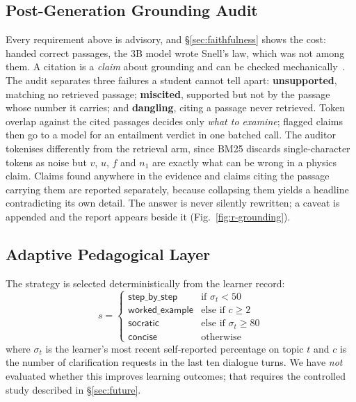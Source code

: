 \documentclass[conference]{IEEEtran}
\begin{document}
\subsection{Post-Generation Grounding Audit}
\label{sec:audit}
Every requirement above is advisory, and §\ref{sec:faithfulness} shows the
cost: handed correct passages, the $3$B model wrote Snell's law, which was not
among them. A citation is a \emph{claim} about grounding and can be checked
mechanically~\cite{manakul2023,gao2023}. The audit separates three failures a
student cannot tell apart: \textbf{unsupported}, matching no retrieved passage;
\textbf{miscited}, supported but not by the passage whose number it carries;
and \textbf{dangling}, citing a passage never retrieved. Token overlap against
the cited passages decides only \emph{what to examine}; flagged claims then go
to a model for an entailment verdict in one batched call. The auditor tokenises
differently from the retrieval arm, since BM25 discards single-character tokens
as noise but $v$, $u$, $f$ and $n_1$ are exactly what can be wrong in a physics
claim. Claims found anywhere in the evidence and claims citing the passage
carrying them are reported separately, because collapsing them yields a headline
contradicting its own detail. The answer is never silently rewritten; a caveat
is appended and the report appears beside it (Fig.~\ref{fig:r-grounding}).

\subsection{Adaptive Pedagogical Layer}
\label{sec:adaptive}
The strategy is selected deterministically from the learner record:
\begin{equation}
s =
\begin{cases}
\textsf{step\_by\_step} & \text{if } \sigma_t < 50\\
\textsf{worked\_example} & \text{else if } c \geq 2\\
\textsf{socratic} & \text{else if } \sigma_t \geq 80\\
\textsf{concise} & \text{otherwise}
\end{cases}
\end{equation}
where $\sigma_t$ is the learner's most recent self-reported percentage on topic
$t$ and $c$ is the number of clarification requests in the last ten dialogue
turns. We have \emph{not} evaluated whether this improves learning outcomes;
that requires the controlled study described in §\ref{sec:future}.
\end{document}
